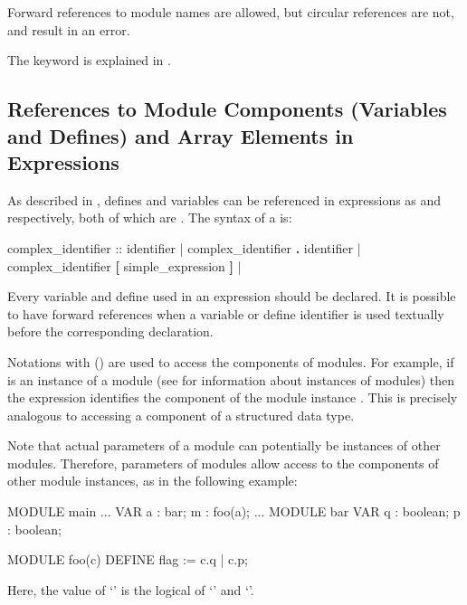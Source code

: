 \noindent Forward references to module names are allowed, but circular
references are not, and result in an error.

The keyword  is explained in .

\subsection{References to Module Components (Variables and Defines) 
            and Array Elements in Expressions}
\label{References to Module Components}

As described in , defines and variables
can be referenced in expressions as  and
 respectively, both of which are
. 
%
The syntax of a  is:\\

\begin{Grammar}
complex_identifier ::
        identifier
      | complex_identifier \textbf{.} identifier
      | complex_identifier \textbf{[} simple_expression \textbf{]}
      | 
\end{Grammar}

Every variable and define used in an expression should be declared. It
is possible to have forward references when a variable or define
identifier is used textually before the corresponding declaration.

Notations with  () are used to access the
components of modules.
%
For example, if  is an instance of a module (see  for information about instances of modules) then the
expression  identifies the component  of the module
instance . 
%
This is precisely analogous to accessing a component of a structured
data type.

Note that actual parameters of a module can potentially be instances
of other modules.
%
Therefore, parameters of modules allow access to the components of
other module instances, as in the following example:
%
\begin{nusmvCode}
MODULE main
...  VAR
  a : bar;
  m : foo(a);
...
MODULE bar
 VAR
   q : boolean;
   p : boolean;

MODULE foo(c)
 DEFINE
   flag := c.q | c.p;
\end{nusmvCode}
%
Here, the value of `' is the logical  of
`' and `'.


